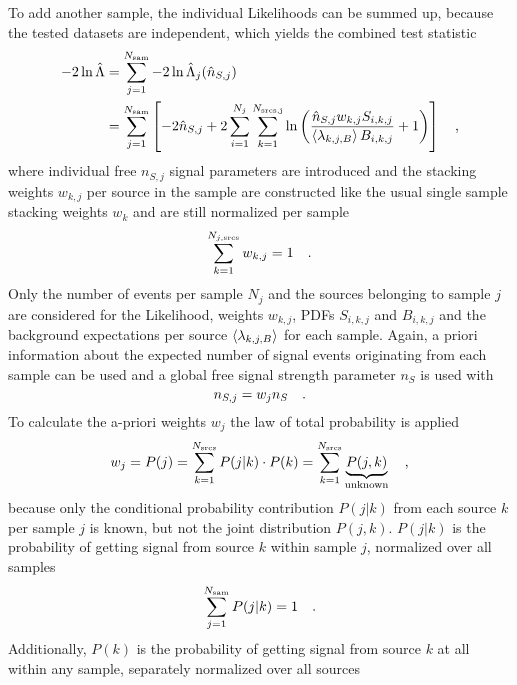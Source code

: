 To add another sample, the individual Likelihoods can be summed up, because the tested datasets are independent, which yields the combined test statistic
\begin{align}
  -2\ln\hat{\Lambda}
  &= \sum_{j=1}^{N_\text{sam}} -2\ln\hat{\Lambda}_j(\hat{n}_{S,j}) \\
  &= \sum_{j=1}^{N_\text{sam}} \left[
        -2\hat{n}_{S,j} +
        2\sum_{i=1}^{N_j} \sum_{k=1}^{N_\text{srcs,j}} \ln\left(
          \frac{\hat{n}_{S,j} w_{k,j} S_{i,k,j}}
               {\Braket{\lambda_{k,j,B}} B_{i,k,j}}
          + 1
        \right)
      \right]
  \quad\text{,}
\end{align}
where individual free $n_{S,j}$ signal parameters are introduced and the stacking weights $w_{k,j}$ per source in the sample are constructed like the usual single sample stacking weights $w_k$ and are still normalized per sample
\begin{equation}
  \sum_{k=1}^{N_{j,\text{srcs}}} w_{k,j} = 1
  \quad\text{.}
\end{equation}
Only the number of events per sample $N_j$ and the sources belonging to sample $j$ are considered for the Likelihood, weights $w_{k,j}$, PDFs $S_{i,k,j}$ and $B_{i,k,j}$ and the background expectations per source $\Braket{\lambda_{k,j,B}}$ for each sample.
Again, a priori information about the expected number of signal events originating from each sample can be used and a global free signal strength parameter $n_S$ is used with
\begin{equation}
  n_{S,j} = w_j n_S
  \quad\text{.}
\end{equation}
To calculate the a-priori weights $w_j$ the law of total probability is applied 
\begin{equation}
  w_j = P(j) = \sum_{k=1}^{N_\text{srcs}} P(j|k)\cdot P(k)
  = \sum_{k=1}^{N_\text{srcs}} \underbrace{P(j,k)}_\text{unknown}
  \quad\text{,}
\end{equation}
because only the conditional probability contribution $P(j|k)$ from each source $k$ per sample $j$ is known, but not the joint distribution $P(j,k)$.
$P(j|k)$ is the probability of getting signal from source $k$ within sample $j$, normalized over all samples
\begin{equation}
  \sum_{j=1}^{N_\text{sam}} P(j|k) = 1
  \quad\text{.}
\end{equation}
Additionally, $P(k)$ is the probability of getting signal from source $k$ at all within any sample, separately normalized over all sources
